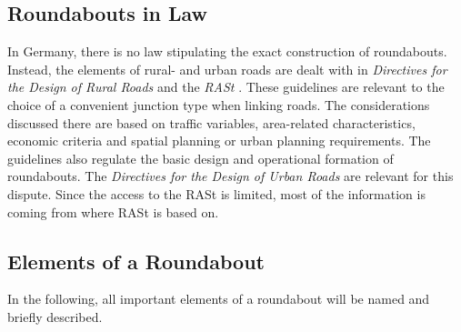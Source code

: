 \subsection{Roundabouts in Law}
%
In Germany, there is no law stipulating the exact construction of roundabouts.
Instead, the elements of rural- and urban roads are dealt with in \emph{Directives for the Design of Rural Roads} \cite{ral13}
and the \emph{\ac{RASt}} \cite{rast06}. These guidelines are relevant to the choice of a convenient junction type when linking roads.
The considerations discussed there are based on traffic variables, area-related characteristics, economic criteria and spatial planning or urban planning requirements. 
The guidelines also regulate the basic design and operational formation of roundabouts.
The \emph{Directives for the Design of Urban Roads} \cite{rast06} are relevant for this dispute. Since the access to the \ac{RASt} is limited, most of the information is coming from
\cite{man06} where \ac{RASt} is based on.
\subsection{Elements of a Roundabout}
In the following, all important elements of a roundabout will be named and briefly described.

